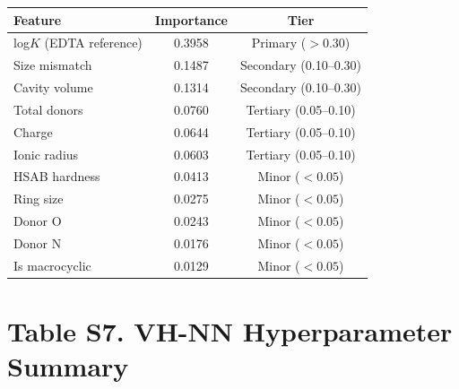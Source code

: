 \documentclass[journal=jacsat,manuscript=suppinfo]{achemso}
\begin{document}
\begin{table}[h!]
  \centering
  \begin{tabular}{@{}lcc@{}}
    \toprule
    Feature & Importance & Tier \\
    \midrule
    log$K$ (EDTA reference) & 0.3958 & Primary ($> 0.30$) \\
    Size mismatch            & 0.1487 & Secondary (0.10--0.30) \\
    Cavity volume            & 0.1314 & Secondary (0.10--0.30) \\
    Total donors             & 0.0760 & Tertiary (0.05--0.10) \\
    Charge                   & 0.0644 & Tertiary (0.05--0.10) \\
    Ionic radius             & 0.0603 & Tertiary (0.05--0.10) \\
    HSAB hardness            & 0.0413 & Minor ($< 0.05$) \\
    Ring size                & 0.0275 & Minor ($< 0.05$) \\
    Donor O                  & 0.0243 & Minor ($< 0.05$) \\
    Donor N                  & 0.0176 & Minor ($< 0.05$) \\
    Is macrocyclic           & 0.0129 & Minor ($< 0.05$) \\
    \bottomrule
  \end{tabular}
\end{table}


\newpage

\section*{Table S7. VH-NN Hyperparameter Summary}
\label{tab:s7}
\end{document}
